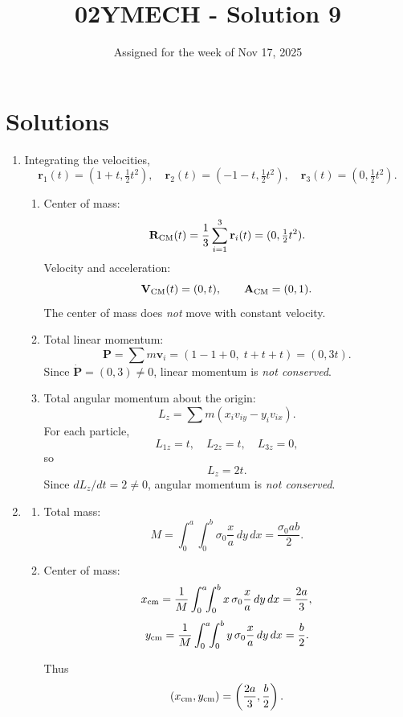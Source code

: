 \documentclass[12pt]{article}
\title{02YMECH - Solution 9}
\date{Assigned for the week of Nov 17, 2025}
\author{}
\begin{document}
\maketitle

\section*{Solutions}

\begin{enumerate}

\item Integrating the velocities,
\[
\mathbf r_1(t)=(1+t,\tfrac12 t^2),\quad
\mathbf r_2(t)=(-1-t,\tfrac12 t^2),\quad
\mathbf r_3(t)=(0,\tfrac12 t^2).
\]

\begin{enumerate}
\item[(a)] Center of mass:
\[
\mathbf R_{\rm CM}(t)=\frac{1}{3}\sum_{i=1}^3 \mathbf r_i(t)
=(0,\tfrac12 t^2).
\]
Velocity and acceleration:
\[
\mathbf V_{\rm CM}(t)=(0,t),\qquad
\mathbf A_{\rm CM}=(0,1).
\]
The center of mass does \emph{not} move with constant velocity.

\item[(b)] Total linear momentum:
\[
\mathbf P=\sum m\mathbf v_i
=(1-1+0,\; t+t+t)=(0,3t).
\]
Since \(\dot{\mathbf P}=(0,3)\neq 0\), linear momentum is \emph{not conserved}.

\item[(c)] Total angular momentum about the origin:
\[
L_z=\sum m(x_i v_{iy}-y_i v_{ix}).
\]
For each particle,
\[
L_{1z}=t,\quad L_{2z}=t,\quad L_{3z}=0,
\]
so
\[
L_z=2t.
\]
Since \(dL_z/dt=2\neq0\), angular momentum is \emph{not conserved}.
\end{enumerate}

\item
\begin{enumerate}
\item[(a)] Total mass:
\[
M=\int_0^a\!\!\int_0^b \sigma_0\frac{x}{a}\,dy\,dx
=\frac{\sigma_0 ab}{2}.
\]

\item[(b)] Center of mass:
\[
x_{\rm cm}=\frac{1}{M}\int_0^a\!\!\int_0^b x\,\sigma_0\frac{x}{a}\,dy\,dx
=\frac{2a}{3},
\]
\[
y_{\rm cm}=\frac{1}{M}\int_0^a\!\!\int_0^b y\,\sigma_0\frac{x}{a}\,dy\,dx
=\frac{b}{2}.
\]

Thus
\[
(x_{\rm cm},y_{\rm cm})=\left(\frac{2a}{3},\frac{b}{2}\right).
\]
\end{enumerate}

\end{enumerate}
\end{document}
